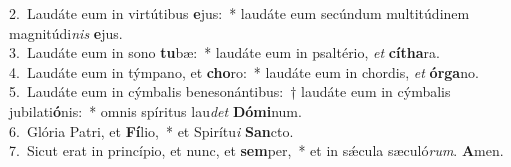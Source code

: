 {2.~}Laudáte eum in virtútibus \textbf{e}jus:~* laudáte eum secúndum multitúdinem magnitúdi\textit{nis} \textbf{e}jus.\\
{3.~}Laudáte eum in sono \textbf{tu}bæ:~* laudáte eum in psaltério, \textit{et} \textbf{cí}\textbf{tha}ra.\\
{4.~}Laudáte eum in týmpano, et \textbf{cho}ro:~* laudáte eum in chordis, \textit{et} \textbf{ór}\textbf{ga}no.\\
{5.~}Laudáte eum in cýmbalis benesonántibus:~† laudáte eum in cýmbalis jubilati\textbf{ó}nis:~* omnis spíritus lau\textit{det} \textbf{Dó}\textbf{mi}num.\\
{6.~}Glória Patri, et \textbf{Fí}lio,~* et Spirítu\textit{i} \textbf{San}cto.\\
{7.~}Sicut erat in princípio, et nunc, et \textbf{sem}per,~* et in sǽcula sæculó\textit{rum}. \textbf{A}men.\\
